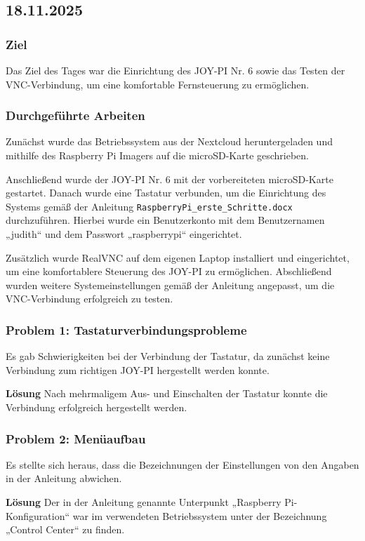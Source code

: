\subsection{18.11.2025}

\subsubsection{Ziel}
Das Ziel des Tages war die Einrichtung des JOY-PI Nr. 6 sowie das
Testen der VNC-Verbindung, um eine komfortable Fernsteuerung zu ermöglichen.

\subsubsection{Durchgeführte Arbeiten}
Zunächst wurde das Betriebssystem aus der Nextcloud heruntergeladen und
mithilfe des Raspberry Pi Imagers auf die microSD-Karte geschrieben.

Anschließend wurde der JOY-PI Nr. 6 mit der vorbereiteten microSD-Karte gestartet.
Danach wurde eine Tastatur verbunden, um die Einrichtung des Systems gemäß
der Anleitung \texttt{RaspberryPi\_erste\_Schritte.docx} durchzuführen.
Hierbei wurde ein Benutzerkonto mit dem Benutzernamen „judith“ und dem Passwort „raspberrypi“ eingerichtet.

Zusätzlich wurde RealVNC auf dem eigenen Laptop installiert und eingerichtet,
um eine komfortablere Steuerung des JOY-PI zu ermöglichen. Abschließend wurden
weitere Systemeinstellungen gemäß der Anleitung angepasst, um die
VNC-Verbindung erfolgreich zu testen.

\subsubsection{Problem 1: Tastaturverbindungsprobleme}
Es gab Schwierigkeiten bei der Verbindung der Tastatur,
da zunächst keine Verbindung zum richtigen JOY-PI hergestellt werden konnte.

\textbf{Lösung}
Nach mehrmaligem Aus- und Einschalten der Tastatur konnte die Verbindung
erfolgreich hergestellt werden.

\subsubsection{Problem 2: Menüaufbau}
Es stellte sich heraus, dass die Bezeichnungen der Einstellungen von
den Angaben in der Anleitung abwichen.

\textbf{Lösung}
Der in der Anleitung genannte Unterpunkt „Raspberry Pi-Konfiguration“
war im verwendeten Betriebssystem unter der Bezeichnung
„Control Center“ zu finden.